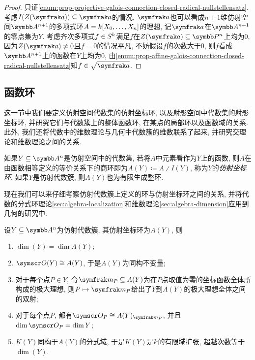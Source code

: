 \begin{proof}
  只证\ref{enum:prop-projective-galois-connection-closed-radical-nullstellensatz}. 考虑$I(Z(\ideal{a}))\subseteq\ideal{a}$的情况. $\ideal{a}$也可以看成$n+1$维仿射空间$\AF^{n+1}$的多项式环$A=k [X_0, \dotsc, X_n]$的理想, 记$\ideal{a}$在$\AF^{n+1}$的零点集为$Y$. 考虑齐次多项式$f\in S^h$满足$f$在$Z(\ideal{a})\subseteq \PP^n$上均为0, 因为$Z(\ideal{a})\neq 0$且$f=0$的情况平凡, 不妨假设$f$的次数大于0, 则$f$看成$\AF^{n+1}$上的函数在$Y$上均为0, 由\ref{enum:prop-affine-galois-connection-closed-radical-nullstellensatz}知$f\in\sqrt{\ideal{a}}$.
\end{proof}

\subsection{函数环}\label{sec:ag-functionrings}

这一节中我们要定义仿射空间代数集的仿射坐标环, 以及射影空间中代数集的射影坐标环, 并研究它们与代数簇上的整体函数环, 在某点的局部环以及函数域的关系. 此外, 我们还将代数中的维数理论与几何中代数簇的维数联系了起来, 并研究交理论和维数理论之间的关系.

如果$Y\subseteq \AF^n$是仿射空间中的代数集, 若将$A$中元素看作为$Y$上的函数, 则$A$在由函数相等定义的等价关系下的商环即为$A(Y)\coloneq A{\divslash}I(Y)$, 称为$Y$的\emph{仿射坐标环}. 如果$Y$是仿射代数簇, 则$A(Y)$也为有限生成整环.

现在我们可以来仔细考察仿射代数簇上定义的环与仿射坐标环之间的关系, 并将代数的分式环理论\ref{sec:algebra-localization}和维数理论\ref{sec:algebra-dimension}应用到几何的研究中.

\begin{theorem}\label{thm:affinerings}
  设$Y\subseteq \AF^n$为仿射代数簇, 其仿射坐标环为$A(Y)$, 则
  \begin{enumerate}
    \item\label{enum:thm-affine-rings-1} $\dim (Y)=\dim A(Y)$;
    \item\label{enum:thm-affine-rings-2} $\OO (Y)\cong A(Y)$, 于是$A(Y)$为同构不变量;
    \item\label{enum:thm-affine-rings-3} 对于每个点$P\in Y$, 令$\ideal{m}_P\subseteq A(Y)$为在$P$点取值为零的坐标函数全体所构成的极大理想, 则$P\mapsto \ideal{m}_P$给出了$Y$到$A(Y)$的极大理想全体之间的双射;
    \item\label{enum:thm-affine-rings-4} 对于每个点$P$, 都有$\OO_P\cong A(Y)_{\ideal{m}_P}$, 并且$\dim \OO_P=\dim Y$;
    \item\label{enum:thm-affine-rings-5} $K(Y)$同构于$A(Y)$的分式域, 于是$K(Y)$是$k$的有限域扩张, 超越次数等于$\dim (Y)$.
  \end{enumerate}
\end{theorem}

